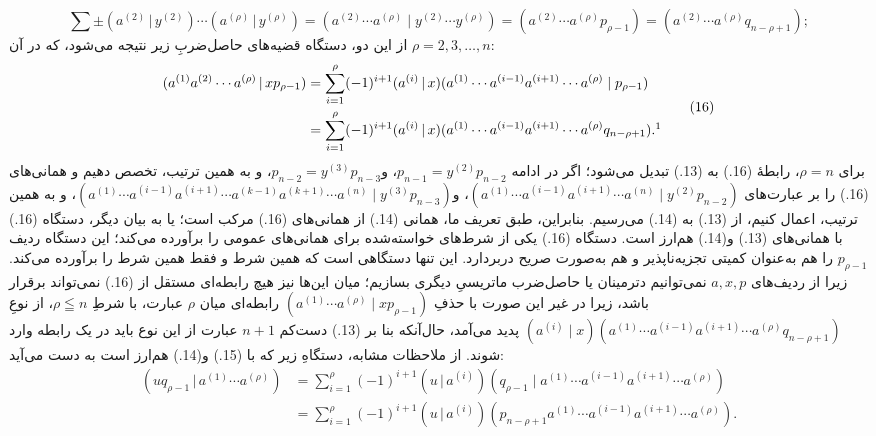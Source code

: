 \documentclass[11pt]{article}
\providecommand{\pair}[2]{(#1\,|\,#2)}
\begin{document}
\[
\sum\pm\pair{a^{(2)}}{y^{(2)}}\cdots\pair{a^{(\rho)}}{y^{(\rho)}}
=(a^{(2)}\cdots a^{(\rho)}\mid y^{(2)}\cdots y^{(\rho)})
=(a^{(2)}\cdots a^{(\rho)}p_{\rho-1})=(a^{(2)}\cdots a^{(\rho)}q_{n-\rho+1});
\]
از این دو، دستگاه قضیه‌های حاصل‌ضربِ زیر نتیجه می‌شود، که در آن $\rho=2,3,\ldots,n$:
\begin{equation}
\begin{aligned}
\pair{a^{(1)}a^{(2)}\cdots a^{(\rho)}}{xp_{\rho-1}}
 &=\sum_{i=1}^{\rho}(-1)^{i+1}\pair{a^{(i)}}{x}(a^{(1)}\cdots a^{(i-1)}a^{(i+1)}\cdots a^{(\rho)}\mid p_{\rho-1})\\
 &=\sum_{i=1}^{\rho}(-1)^{i+1}\pair{a^{(i)}}{x}(a^{(1)}\cdots a^{(i-1)}a^{(i+1)}\cdots a^{(\rho)}q_{n-\rho+1}).\footnotemark
\end{aligned}
\tag{16}
\end{equation}
برای $\rho=n$، رابطهٔ (16.) به (13.) تبدیل می‌شود؛ اگر در ادامه $p_{n-1}=y^{(2)}p_{n-2}$، و$p_{n-2}=y^{(3)}p_{n-3}$، و به همین ترتیب، تخصص دهیم و همانی‌های (16.) را بر عبارت‌های $(a^{(1)}\cdots a^{(i-1)}a^{(i+1)}\cdots a^{(n)}\mid y^{(2)}p_{n-2})$، و$(a^{(1)}\cdots a^{(i-1)}a^{(i+1)}\cdots a^{(k-1)}a^{(k+1)}\cdots a^{(n)}\mid y^{(3)}p_{n-3})$، و به همین ترتیب، اعمال کنیم، از (13.) به (14.) می‌رسیم. بنابراین، طبق تعریف ما، همانی (14.) از همانی‌های (16.) مرکب است؛ یا به بیان دیگر، دستگاه (16.) با همانی‌های (13.) و(14.) هم‌ارز است. دستگاه (16.) یکی از شرط‌های خواسته‌شده برای همانی‌های عمومی را برآورده می‌کند؛ این دستگاه ردیف $p_{\rho-1}$ را هم به‌عنوان کمیتی تجزیه‌ناپذیر و هم به‌صورت صریح دربردارد. این تنها دستگاهی است که همین شرط و فقط همین شرط را برآورده می‌کند. زیرا از ردیف‌های $a,x,p$ نمی‌توانیم دترمینان یا حاصل‌ضرب ماتریسیِ دیگری بسازیم؛ میان این‌ها نیز هیچ رابطه‌ای مستقل از (16.) نمی‌تواند برقرار باشد، زیرا در غیر این صورت با حذفِ $(a^{(1)}\cdots a^{(\rho)}\mid xp_{\rho-1})$ رابطه‌ای میان $\rho$ عبارت، با شرطِ $\rho\leqq n$، از نوعِ $(a^{(i)}\mid x)(a^{(1)}\cdots a^{(i-1)}a^{(i+1)}\cdots a^{(\rho)}q_{n-\rho+1})$ پدید می‌آمد، حال‌آنکه بنا بر (13.) دست‌کم $n+1$ عبارت از این نوع باید در یک رابطه وارد شوند. از ملاحظات مشابه، دستگاهِ زیر که با (15.) و(14.) هم‌ارز است به دست می‌آید:
\begin{equation}
\begin{aligned}
\pair{u q_{\rho-1}}{a^{(1)}\cdots a^{(\rho)}}
 &=\sum_{i=1}^{\rho}(-1)^{i+1}\pair{u}{a^{(i)}}(q_{\rho-1}\mid a^{(1)}\cdots a^{(i-1)}a^{(i+1)}\cdots a^{(\rho)})\\
 &=\sum_{i=1}^{\rho}(-1)^{i+1}\pair{u}{a^{(i)}}(p_{n-\rho+1}a^{(1)}\cdots a^{(i-1)}a^{(i+1)}\cdots a^{(\rho)}).
\end{aligned}
\tag{17}
\end{equation}
\end{document}

